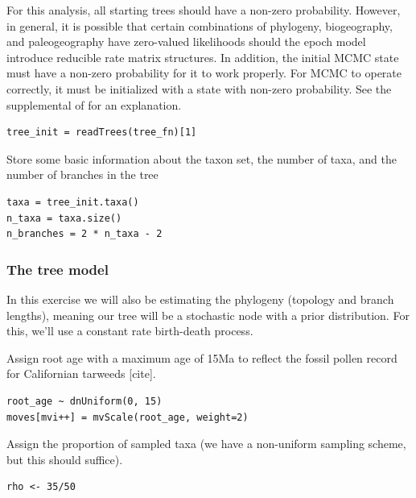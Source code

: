 For this analysis, all starting trees should have a non-zero probability.
However, in general, it is possible that certain combinations of phylogeny, biogeography, and paleogeography have zero-valued likelihoods should the epoch model introduce reducible rate matrix structures.
In addition, the initial MCMC state must have a non-zero probability for it to work properly.
For MCMC to operate correctly, it must be initialized with a state with non-zero probability.
See the supplemental of \citet{Buerki2011} for an explanation.

\begin{snugshade}
\begin{lstlisting}
tree_init = readTrees(tree_fn)[1]
\end{lstlisting}
\end{snugshade}


Store some basic information about the taxon set, the number of taxa, and the number of branches in the tree

\begin{snugshade}
\begin{lstlisting}
taxa = tree_init.taxa()
n_taxa = taxa.size()
n_branches = 2 * n_taxa - 2
\end{lstlisting}
\end{snugshade}

\subsubsection{The tree model}

In this exercise we will also be estimating the phylogeny (topology and branch lengths), meaning our tree will be a stochastic node with a prior distribution.
For this, we'll use a constant rate birth-death process.

Assign root age with a maximum age of 15Ma to reflect the fossil pollen record for Californian tarweeds [cite].

\begin{snugshade}
\begin{lstlisting}
root_age ~ dnUniform(0, 15)
moves[mvi++] = mvScale(root_age, weight=2)
\end{lstlisting}
\end{snugshade}

Assign the proportion of sampled taxa (we have a non-uniform sampling scheme, but this should suffice).
\begin{snugshade}
\begin{lstlisting}
rho <- 35/50
\end{lstlisting}
\end{snugshade}

